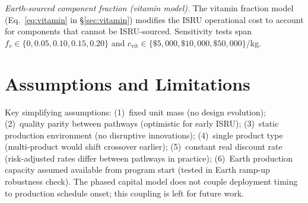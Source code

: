 \documentclass[preprint,12pt]{elsarticle}
\begin{document}
\emph{Earth-sourced component fraction (vitamin model).} The vitamin fraction model (Eq.~\ref{eq:vitamin} in \S\ref{sec:vitamin}) modifies the ISRU operational cost to account for components that cannot be ISRU-sourced. Sensitivity tests span $f_v \in \{0, 0.05, 0.10, 0.15, 0.20\}$ and $c_{\mathrm{vit}} \in \{\$5{,}000, \$10{,}000, \$50{,}000\}$/kg.

\section{Assumptions and Limitations}
\label{sec:appendix_assumptions}

Key simplifying assumptions: (1)~fixed unit mass (no design evolution); (2)~quality parity between pathways (optimistic for early ISRU); (3)~static production environment (no disruptive innovations); (4)~single product type (multi-product would shift crossover earlier); (5)~constant real discount rate (risk-adjusted rates differ between pathways in practice); (6)~Earth production capacity assumed available from program start (tested in Earth ramp-up robustness check). The phased capital model does not couple deployment timing to production schedule onset; this coupling is left for future work.
\end{document}

